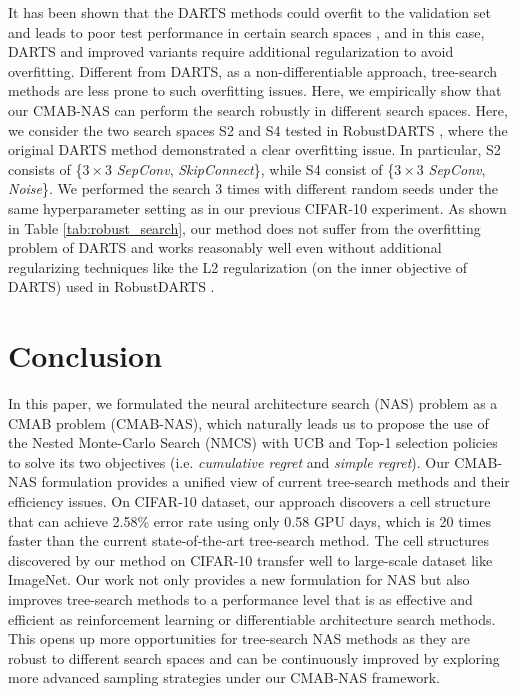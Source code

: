 \documentclass[conference]{IEEEtran}
\begin{document}
\par
It has been shown that the DARTS methods could overfit to the validation set and leads to poor test performance in certain search spaces \cite{DBLP:conf/iclr/ZelaESMBH20}, and in this case, DARTS and improved variants require additional regularization to avoid overfitting. 
Different from DARTS, as a non-differentiable approach, tree-search methods are less prone to such overfitting issues.
Here, we empirically show that our CMAB-NAS can perform the search robustly in different search spaces. 
Here, we consider the two search spaces S2 and S4 tested in RobustDARTS \cite{DBLP:conf/iclr/ZelaESMBH20}, where the original DARTS method demonstrated a clear overfitting issue.
In particular, S2 consists of \{$3 \times 3$ \emph{SepConv}, \emph{SkipConnect}\}, while S4 consist of \{$3 \times 3$ \emph{SepConv}, \emph{Noise}\}. 
We performed the search 3 times with different random seeds under the same hyperparameter setting as in our previous CIFAR-10 experiment.
As shown in Table \ref{tab:robust_search}, our method does not suffer from the overfitting problem of DARTS and works reasonably well even without additional regularizing techniques like the L2 regularization (on the inner objective of DARTS) used in RobustDARTS \cite{DBLP:conf/iclr/ZelaESMBH20}.


\section{Conclusion}
\par
In this paper, we formulated the neural architecture search (NAS) problem as a CMAB problem (CMAB-NAS), which naturally leads us to propose the use of the Nested Monte-Carlo Search (NMCS) with UCB and Top-1 selection policies to solve its two objectives (i.e. \emph{cumulative regret} and \emph{simple regret}). Our CMAB-NAS formulation provides a unified view of current tree-search methods and their efficiency issues.
On CIFAR-10 dataset, our approach discovers a cell structure that can achieve 2.58\% error rate using only 0.58 GPU days, which is 20 times faster than the current state-of-the-art tree-search method. The cell structures discovered by our method on CIFAR-10 transfer well to large-scale dataset like ImageNet.
Our work not only provides a new formulation for NAS but also improves tree-search methods to a performance level that is as effective and efficient as reinforcement learning or differentiable architecture search methods.
This opens up more opportunities for tree-search NAS methods as they are robust to different search spaces and can be continuously improved by exploring more advanced sampling strategies under our CMAB-NAS framework.
\end{document}
